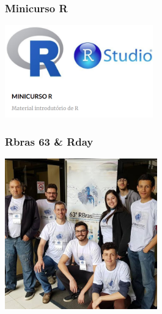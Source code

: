 \documentclass[10pt,
  aspectratio=169,
  serif,
  mathserif,
  professionalfont,
  compress,
  handout,
  ]{beamer}\usepackage[]{graphicx}\usepackage[]{color}
\begin{document}

\begin{frame}

\frametitle{Minicurso R}

\begin{center}
  \includegraphics[height=4cm]{img/minicurso1.png}
\end{center}

\end{frame}


\begin{frame}

\frametitle{Rbras 63 \& Rday}

\begin{center}
  \includegraphics[height=6.5cm]{img/rbras.jpg}
\end{center}

\end{frame}


\end{document}
